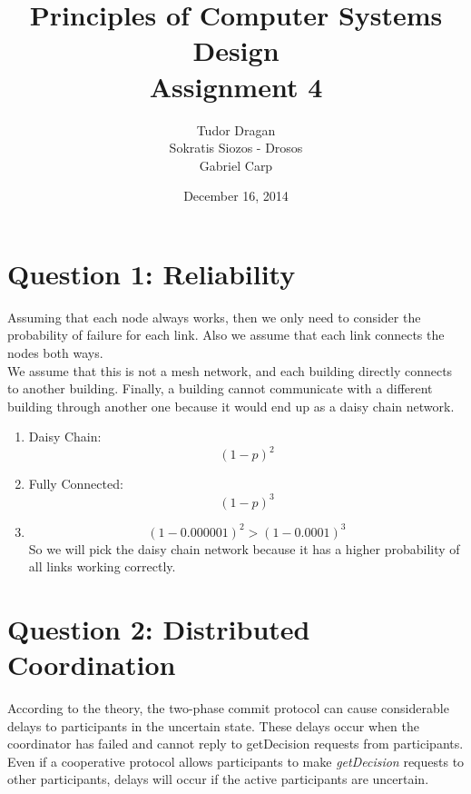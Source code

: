 \documentclass{article}      %
\title{\bf Principles of Computer Systems Design\\ {\Large Assignment 4}}  %
\author{Tudor Dragan\\
Sokratis Siozos - Drosos \\
Gabriel Carp}      %
\date{December 16, 2014}      %
\begin{document}

\maketitle                   %

\section*{Question 1: Reliability} 

Assuming that each node always works, then we only need to consider the probability of failure for each link. Also we assume that each link connects the nodes both ways.\\

We assume that this is not a mesh network, and each building directly connects to another building. Finally, a building cannot communicate with a different building through another one because it would end up as a daisy chain network.\\

\begin{enumerate}
\item  
Daisy Chain: 
\begin{equation}
(1-p)^2
\end{equation}

\item  
Fully Connected:
\begin{equation}
(1-p)^3
\end{equation}

\item 
\begin{equation}
(1-0.000001)^2 > (1-0.0001)^3
\end{equation}
So we will pick the daisy chain network because it has a higher probability of all links working correctly.
\end{enumerate}

\section*{Question 2: Distributed Coordination}

According to the theory, the two-phase commit protocol can cause considerable delays to participants in the uncertain state. These delays occur when the coordinator has failed and cannot reply to getDecision requests from participants. Even if a cooperative protocol allows participants to make \emph{getDecision} requests to other participants, delays will occur if the active participants are uncertain.  \\
\end{document}
